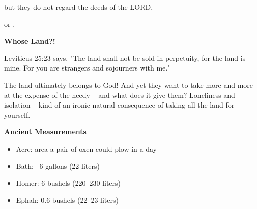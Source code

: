 \documentclass[11pt]{article}
\begin{document}
\begin{chiasticoutline}[Isaiah 5:8-14 (B)]{.95em}{2em}
{        but they do not regard the deeds of the LORD,

        \poetryline or .
    }
     
    

\end{chiasticoutline}


\vspace{3em}
{\large\bfseries Whose Land?!}
\vspace{1em}

Leviticus 25:23 says, "The land shall not be sold in perpetuity, for the land is mine. For you are strangers and sojourners with me."

{\vspace{1em}}
The land ultimately belongs to God! And yet they want to take more and more at the expense of the needy – and what does it give them? Loneliness and isolation – kind of an ironic natural consequence of taking all the land for yourself.


\vspace{3em}
{\large\bfseries Ancient Measurements}

\begin{itemize}
    \item Acre: area a pair of oxen could plow in a day
    \item Bath: ~6 gallons (22 liters)
    \item Homer: 6 bushels (220–230 liters)
    \item Ephah: 0.6 bushels (22–23 liters)
\end{itemize}

\vspace{1em}
\end{document}
